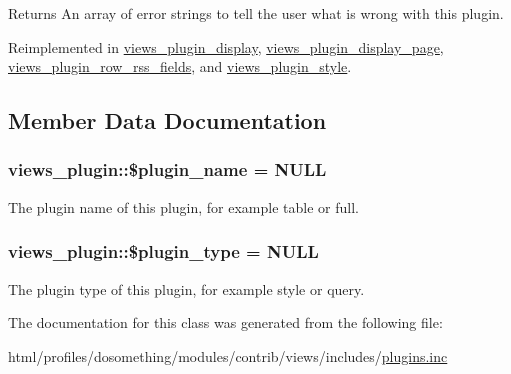 \begin{DoxyReturn}{Returns}
An array of error strings to tell the user what is wrong with this plugin. 
\end{DoxyReturn}


Reimplemented in \hyperlink{classviews__plugin__display_a3282edb1b32b756937fe2d0c8757c80c}{views\_\-plugin\_\-display}, \hyperlink{classviews__plugin__display__page_a995cf48d67e20ef897d931fcbba391d1}{views\_\-plugin\_\-display\_\-page}, \hyperlink{classviews__plugin__row__rss__fields_ac4f5e75bc5a2277ed9041c18a3f2926d}{views\_\-plugin\_\-row\_\-rss\_\-fields}, and \hyperlink{classviews__plugin__style_a41929fec27cb0ae7a801276969a080a1}{views\_\-plugin\_\-style}.

\subsection{Member Data Documentation}
\hypertarget{classviews__plugin_a7db77a3a04654e3dbd555980375bcd6d}{
\subsubsection[{\$plugin\_\-name}]{\setlength{\rightskip}{0pt plus 5cm}views\_\-plugin::\$plugin\_\-name = NULL}}
\label{classviews__plugin_a7db77a3a04654e3dbd555980375bcd6d}
The plugin name of this plugin, for example table or full. \hypertarget{classviews__plugin_aac8d238d0a27a1bbafe4c388d8138b33}{
\subsubsection[{\$plugin\_\-type}]{\setlength{\rightskip}{0pt plus 5cm}views\_\-plugin::\$plugin\_\-type = NULL}}
\label{classviews__plugin_aac8d238d0a27a1bbafe4c388d8138b33}
The plugin type of this plugin, for example style or query. 

The documentation for this class was generated from the following file:\begin{DoxyCompactItemize}
\item 
html/profiles/dosomething/modules/contrib/views/includes/\hyperlink{views_2includes_2plugins_8inc}{plugins.inc}\end{DoxyCompactItemize}
